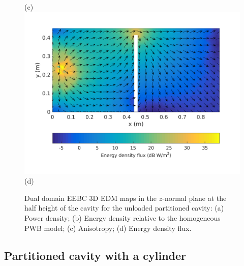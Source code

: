 \documentclass[a4paper]{article}
\numberwithin{equation}{section}
\begin{document}
\begin{figure}[ht]
\begin{center}
{\footnotesize (c)}\\
\vspace{2mm}
\includegraphics[trim={0 8mm 0 12mm},clip,width=0.52\linewidth]{figures/DDM-EEBC_3D_DU_EnergyDensityFluxMap}\\
{\footnotesize (d)}\\
\vspace{-2mm}
\caption{\label{fg:partemptyddm_maps} Dual domain EEBC 3D EDM maps in the $z$-normal plane at the half height of the cavity for the 
unloaded partitioned cavity: (a) Power density; (b) Energy density relative to the homogeneous PWB model;
(c) Anisotropy; (d) Energy density flux.}
\end{center}
\end{figure}

\subsection[Partitioned cavity with a cylinder]{Partitioned cavity with a cylinder}
\label{sc:res:cylpart}
\end{document}
